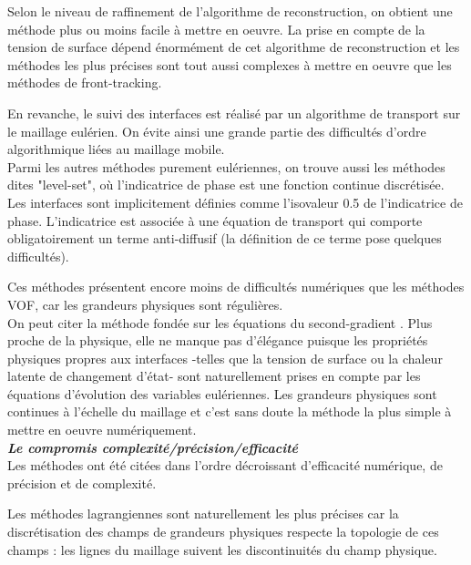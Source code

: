 Selon le niveau de raffinement de l'algorithme de reconstruction, on obtient une m\'ethode plus ou moins facile
à mettre en oeuvre. La prise en compte de la tension de surface d\'epend \'enorm\'ement de cet algorithme
de reconstruction et les m\'ethodes les plus pr\'ecises sont tout aussi complexes à mettre en oeuvre
que les m\'ethodes de front-tracking.

En revanche, le suivi des interfaces est r\'ealis\'e par un algorithme de transport sur le maillage eul\'erien.
On \'evite ainsi une grande partie des difficult\'es d'ordre algorithmique li\'ees au maillage mobile.\\

Parmi les autres m\'ethodes purement eul\'eriennes, on trouve aussi les m\'ethodes dites "level-set",
o\`u l'indicatrice de phase est une fonction continue discr\'etis\'ee.
Les interfaces sont implicitement d\'efinies comme l'isovaleur 0.5 de l'indicatrice de phase.
L'indicatrice est associ\'ee à une \'equation de transport qui comporte obligatoirement un terme anti-diffusif
(la d\'efinition de ce terme pose quelques difficult\'es).

Ces m\'ethodes pr\'esentent encore moins de difficult\'es num\'eriques que les m\'ethodes VOF,
car les grandeurs physiques sont r\'eguli\`eres.\\

On peut citer la m\'ethode fond\'ee sur les \'equations du second-gradient \cite{Jamet2001}.
Plus proche de la physique, elle ne manque pas d'\'el\'egance puisque les propri\'et\'es physiques
propres aux interfaces -telles que la tension de surface ou la chaleur latente de changement d'\'etat-
sont naturellement prises en compte par les \'equations d'\'evolution des variables eul\'eriennes.
Les grandeurs physiques sont continues \`a l'\'echelle du maillage et c'est sans doute
la m\'ethode la plus simple à mettre en oeuvre num\'eriquement.
\smallskip \\

\textit{\textbf{Le compromis complexit\'e/pr\'ecision/efficacit\'e}}
\smallskip \\

Les m\'ethodes ont \'et\'e cit\'ees dans l'ordre d\'ecroissant
d'efficacit\'e num\'erique, de pr\'ecision et de complexit\'e.

Les m\'ethodes lagrangiennes sont naturellement les plus pr\'ecises car la discr\'etisation des champs
de grandeurs physiques respecte la topologie de ces champs :
les lignes du maillage suivent les discontinuit\'es du champ physique.

